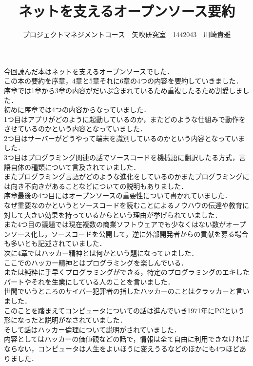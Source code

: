 \documentclass[uplatex,twocolumn,dvipdfmx]{jsarticle}
\title{\vspace{-5mm}\fontsize{14pt}{0pt}\selectfont ネットを支えるオープンソース要約}
\author{\normalsize プロジェクトマネジメントコース　矢吹研究室　1442043　川崎貴雅}
\date{}
\begin{document}
\fontsize{10.5pt}{\baselineskip}\selectfont
\maketitle





今回読んだ本はネットを支えるオープンソースでした．\\
この本の要約を序章，4章と5章それに6章の4つの内容を要約していきました．\\
序章では1章から3章の内容がだいぶ含まれているため重複したるため割愛しました．\\
初めに序章では4つの内容からなっていました．\\
1つ目はアプリがどのように起動しているのか，またどのような仕組みで動作をさせているのかという内容となっていました．\\
2つ目はサーバーがどうやって端末を識別しているのかという内容となっていました．\\
3つ目はプログラミング関連の話でソースコードを機械語に翻訳したる方式，言語自体の種類について言及されていました．\\
またプログラミング言語がどのような進化をしているのかまたプログラミングには向き不向きがあることなどについての説明もありました．\\
序章最後の4つ目にはオープンソースの重要性について書かれていました．\\
なぜ重要なのかというとソースコードを読むことによるノウハウの伝達や教育に対して大きい効果を持っているからという理由が挙げられていました．\\
また4つ目の議題では現在複数の商業ソフトウェアでも少なくはない数がオープンソース化し，ソースコードを公開して，逆に外部開発者からの貢献を募る場合も多いとも記述されていました．\\
次に4章ではハッカー精神とは何かという題になっていました．\\
ここでのハッカー精神とはプログラミングを楽しんでいる．\\または純粋に手早くプログラミングができる，特定のプログラミングのエキしたパートやそれを生業にしている人のことを言いました．\\
世間でいうところのサイバー犯罪者の指したハッカーのことはクラッカーと言いました．\\
このことを踏まえてコンピュータについての話は進んでいき1971年にPCという形になったと説明がなされていました．\\
そして話はハッカー倫理について説明がされていました．\\
内容としてはハッカーの価値観などの話で，情報は全て自由に利用できなければならない，コンピュータは人生をよいほうに変えうるなどのほかにも4つほどありました．\\
\end{document}

